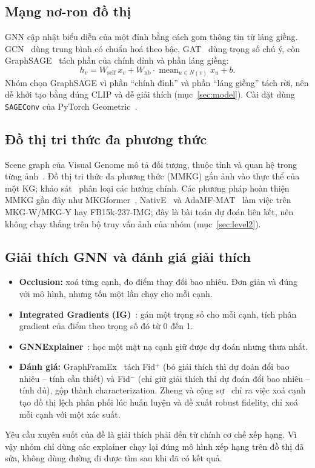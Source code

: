 \documentclass[12pt, a4paper]{article}
\newcommand{\code}[1]{\texttt{#1}}
\begin{document}
\subsection{Mạng nơ-ron đồ thị}
GNN cập nhật biểu diễn của một đỉnh bằng cách gom thông tin từ láng giềng. GCN~\cite{kipf2017gcn} dùng trung bình có chuẩn hoá theo bậc, GAT~\cite{velickovic2018gat} dùng trọng số chú ý, còn GraphSAGE~\cite{hamilton2017sage} tách phần của chính đỉnh và phần láng giềng:
\begin{equation}
h_v = W_{\text{self}}\,x_v + W_{\text{nb}}\cdot \operatorname{mean}_{u\in N(v)} x_u + b.
\end{equation}
Nhóm chọn GraphSAGE vì phần ``chính đỉnh'' và phần ``láng giềng'' tách rời, nên dễ khởi tạo bằng đúng CLIP và dễ giải thích (mục~\ref{sec:model}). Cài đặt dùng \code{SAGEConv} của PyTorch Geometric~\cite{fey2019pyg}.

\subsection{Đồ thị tri thức đa phương thức}
Scene graph của Visual Genome mô tả đối tượng, thuộc tính và quan hệ trong từng ảnh~\cite{krishna2017vg}. Đồ thị tri thức đa phương thức (MMKG) gắn ảnh vào thực thể của một KG; khảo sát~\cite{chen2024kgmm} phân loại các hướng chính. Các phương pháp hoàn thiện MMKG gần đây như MKGformer~\cite{chen2022mkgformer}, NativE~\cite{zhang2024native} và AdaMF-MAT~\cite{zhang2024adamf} làm việc trên MKG-W/MKG-Y hay FB15k-237-IMG; đây là bài toán dự đoán liên kết, nên không chạy thẳng trên bộ truy vấn ảnh của nhóm (mục~\ref{sec:level2}).

\subsection{Giải thích GNN và đánh giá giải thích}
\begin{itemize}
\item \textbf{Occlusion:} xoá từng cạnh, đo điểm thay đổi bao nhiêu. Đơn giản và đúng với mô hình, nhưng tốn một lần chạy cho mỗi cạnh.
\item \textbf{Integrated Gradients (IG)}~\cite{sundararajan2017ig}: gán một trọng số cho mỗi cạnh, tích phân gradient của điểm theo trọng số đó từ 0 đến 1.
\item \textbf{GNNExplainer}~\cite{ying2019gnnexplainer}: học một mặt nạ cạnh giữ được dự đoán nhưng thưa nhất.
\item \textbf{Đánh giá:} GraphFramEx~\cite{amara2022graphframex} tách Fid$^+$ (bỏ giải thích thì dự đoán đổi bao nhiêu -- tính cần thiết) và Fid$^-$ (chỉ giữ giải thích thì dự đoán đổi bao nhiêu -- tính đủ), gộp thành characterization. Zheng và cộng sự~\cite{zheng2024robust} chỉ ra việc xoá cạnh tạo đồ thị lệch phân phối lúc huấn luyện và đề xuất robust fidelity, chỉ xoá mỗi cạnh với một xác suất.
\end{itemize}
Yêu cầu xuyên suốt của đề là giải thích phải đến từ chính cơ chế xếp hạng. Vì vậy nhóm chỉ dùng các explainer chạy lại đúng mô hình xếp hạng trên đồ thị đã sửa, không dùng đường đi được tìm sau khi đã có kết quả.
\end{document}

